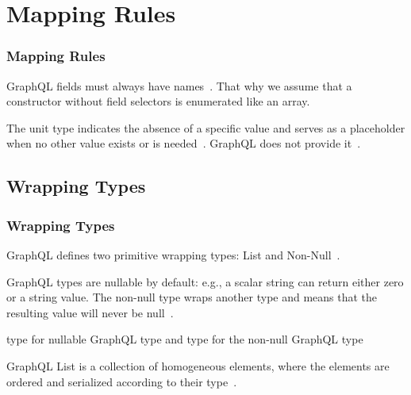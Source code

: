 


\section{Mapping Rules}

\begin{frame}\frametitle{Mapping Rules}

\footnotesize
\begin{itemize}

   GraphQL fields must always have names~\cite{gql-spec}. 
  That why we assume that a constructor without field selectors is enumerated like an array.
  

   The unit type indicates the absence of a specific value and serves as a placeholder when no other value exists or is needed~\cite{fsharp-unit}. GraphQL does not provide it~\cite{gql-spec}. 


\end{itemize}
\end{frame}

\subsection{Wrapping Types}
\begin{frame}\frametitle{Wrapping Types}

GraphQL defines two primitive wrapping types: List and Non-Null~\cite{gql-spec}.

\begin{itemize}

   GraphQL types are nullable by default: e.g., a scalar string can return either zero or a string value. The non-null type wraps another type and means that the resulting value will never be null~\cite{gql-spec}.

    type  for nullable GraphQL type  and type  for the non-null GraphQL type 

   GraphQL List is a collection of homogeneous elements, where the elements are ordered and serialized according to their type~\cite{gql-spec}. 
\end{itemize}

\end{frame}


